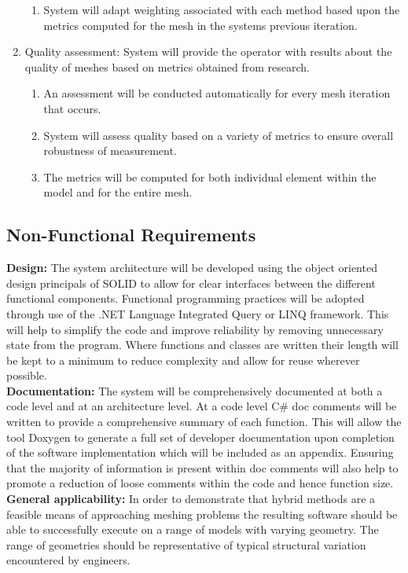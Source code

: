 \begin{enumerate}
\begin{enumerate}
\item System will adapt weighting associated with each method based upon the metrics computed for the mesh in the systems previous iteration.
\end{enumerate}

\item Quality assessment: System will provide the operator with results about the quality of meshes based on metrics obtained from research.

\begin{enumerate}
\item An assessment will be conducted automatically for every mesh iteration that occurs.

\item System will assess quality based on a variety of metrics to ensure overall robustness of measurement. 

\item The metrics will be computed for both individual element within the model and for the entire mesh.
\end{enumerate}
\end{enumerate}

\subsection{Non-Functional Requirements}


\textbf{Design:} The system architecture will be developed using the object oriented design principals of SOLID to allow for clear interfaces between the different functional components. Functional programming practices will be adopted through use of the .NET Language Integrated Query or LINQ framework. This will help to simplify the code and improve reliability by removing unnecessary state from the program. Where functions and classes are written their length will be kept to a minimum to reduce complexity and allow for reuse wherever possible. \\ 

\noindent
\textbf{Documentation:} The system will be comprehensively documented at both a code level and at an architecture level. At a code level C\# doc comments will be written to provide a comprehensive summary of each function. This will allow the tool Doxygen \cite{Doxygen} to generate a full set of developer documentation upon completion of the software implementation which will be included as an appendix. Ensuring that the majority of information is present within doc comments will also help to promote a reduction of loose comments within the code and hence function size. \\

\noindent
\textbf{General applicability:} In order to demonstrate that hybrid methods are a feasible means of approaching meshing problems the resulting software should be able to successfully execute on a range of models with varying geometry. The range of geometries should be representative of typical structural variation encountered by engineers.